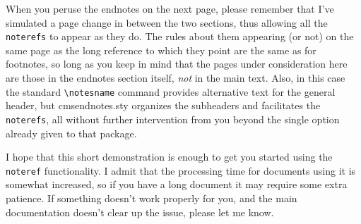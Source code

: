 \documentclass[a4paper,12pt]{article}
\newcommand{\cmd}[1]{\texttt{\textbackslash #1}}
\newcommand{\mylittlespace}{\vspace{5pt}}%
\begin{document}
\mylittlespace When you peruse the endnotes on the next page, please
remember that I've simulated a page change in between the two
sections, thus allowing all the \texttt{noterefs} to appear as they
do.  The rules about them appearing (or not) on the same page as the
long reference to which they point are the same as for footnotes, so
long as you keep in mind that the pages under consideration here are
those in the endnotes section itself, \emph{not} in the main text.
Also, in this case the standard \cmd{notesname} command provides
alternative text for the general header, but \textsf{cmsendnotes.sty}
organizes the subheaders and facilitates the \texttt{noterefs}, all
without further intervention from you beyond the single option already
given to that package.

\mylittlespace I hope that this short demonstration is enough to get
you started using the \texttt{noteref} functionality.  I admit that
the processing time for documents using it is somewhat increased, so
if you have a long document it may require some extra patience.  If
something doesn't work properly for you, and the main documentation
doesn't clear up the issue, please let me know.

\def\notesname{Endnotes to \S\S~5--6}
\theendnotesbypart
\end{document}

